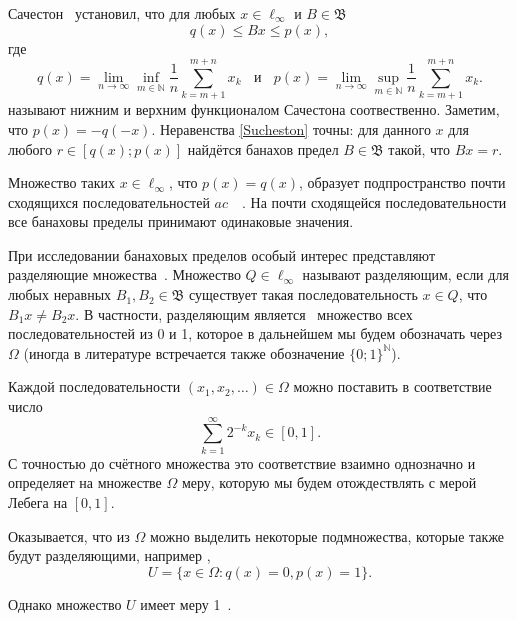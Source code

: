 \documentclass[a4paper,14pt]{article} %
\theoremstyle{plain}
\begin{document}
Сачестон~\cite{sucheston1967banach} установил, что
для любых $x\in \ell_\infty$ и $B\in\mathfrak{B}$
\begin{equation}\label{Sucheston}
	q(x) \leqslant Bx \leqslant p(x)
	,
\end{equation}
где
\begin{equation*}
	q(x) = \lim_{n\to\infty} \inf_{m\in\mathbb{N}}  \frac{1}{n} \sum_{k=m+1}^{m+n} x_k
	~~~~\mbox{и}~~~~
	p(x) = \lim_{n\to\infty} \sup_{m\in\mathbb{N}}  \frac{1}{n} \sum_{k=m+1}^{m+n} x_k
	.
\end{equation*}
называют нижним и верхним функционалом Сачестона соотвественно.
Заметим, что $p(x) = -q(-x)$.
Неравенства \eqref{Sucheston} точны:
для данного $x$ для любого $r\in[q(x); p(x)]$ найдётся банахов предел
$B\in\mathfrak{B}$ такой, что $Bx = r$.

Множество таких $x\in\ell_\infty$, что $p(x)=q(x)$,
образует подпространство почти сходящихся последовательностей $ac$~~\cite{lorentz1948contribution}.
На почти сходящейся последовательности все банаховы пределы принимают одинаковые значения.

При исследовании банаховых пределов особый интерес представляют разделяющие множества~\cite[\S 3]{Semenov2014geomprops}.
Множество $Q\in\ell_\infty$ называют разделяющим, если
для любых неравных $B_1, B_2\in\mathfrak{B}$ существует такая последовательность $x\in Q$,
что $B_1 x \neq B_2 x$.
В частности, разделяющим является~\cite{semenov2010characteristic} множество всех последовательностей из 0 и 1,
которое в дальнейшем мы будем обозначать через $\Omega$
(иногда в литературе встречается также обозначение $\{0;1\}^\mathbb{N}$).

Каждой последовательности $(x_1, x_2, \dots)\in \Omega$ можно поставить в соответствие число
\begin{equation}\label{eq:bijection_omega_0_1}
	\sum_{k=1}^\infty 2^{-k} x_k \in [0,1]
	.
\end{equation}
С точностью до счётного множества это соответствие взаимно однозначно и определяет на множестве $\Omega$ меру,
которую мы будем отождествлять с мерой Лебега на $[0,1]$.

Оказывается, что из $\Omega$ можно выделить некоторые подмножества, которые также будут разделяющими,
например \cite[\S 3, Теорема 11]{Semenov2014geomprops},
\begin{equation}
	U = \{ x\in\Omega: q(x) = 0, p(x) = 1 \}
	.
\end{equation}

Однако множество $U$ имеет меру 1~\cite{semenov2010characteristic}.
\end{document}
